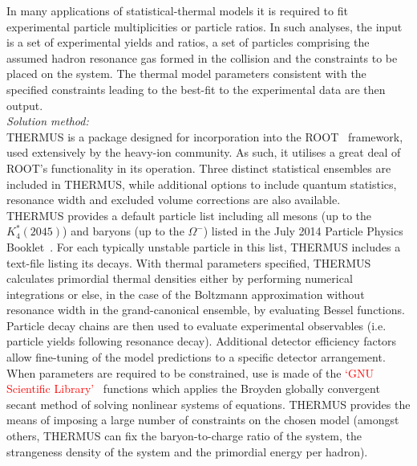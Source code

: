\documentclass{elsarticle}
\begin{document}
\begin{small}
In many applications of statistical-thermal models it is required to fit experimental 
particle multiplicities or particle ratios. In such analyses, the 
input is a set of experimental yields and ratios, a set of particles comprising 
the assumed hadron resonance gas formed in the collision and the constraints to be placed on the system. The thermal model parameters 
consistent with the specified constraints leading to the best-fit 
to the experimental data are then output.\\    

{\em Solution method:}\\

THERMUS is a package designed for incorporation into the ROOT~\cite{Brun:1997pa} framework, used extensively by the 
heavy-ion community. As such, it utilises a great deal of ROOT's functionality in its operation. Three 
distinct statistical ensembles are included in THERMUS, while additional options to include 
quantum statistics, resonance width and excluded volume corrections are also available.\\

THERMUS provides a default particle list including all mesons (up to the $K_4^*(2045)$) and 
baryons (up to the $\Omega^-$) listed in the July 2014 Particle Physics Booklet~\cite{Agashe:2014kda}.
For each typically unstable particle in 
this list, THERMUS includes a text-file listing its decays. With thermal parameters specified, 
THERMUS calculates primordial thermal densities either by 
performing numerical integrations or else, in the case of the Boltzmann approximation without resonance width in the grand-canonical ensemble, 
by evaluating Bessel functions. Particle decay chains are then used to evaluate 
experimental observables (i.e. particle yields following resonance decay). Additional detector efficiency 
factors allow fine-tuning of the model predictions to a specific detector arrangement.\\

When parameters are required to be constrained, use is made of the 
\textcolor{red}{`GNU Scientific Library'~\cite{galassi:2009gsl}} functions which applies the Broyden globally
convergent secant method of solving nonlinear systems of equations. THERMUS provides the means 
of imposing a large number of constraints on the chosen model (amongst others, THERMUS can fix the 
baryon-to-charge ratio of the system, the strangeness density of the system and the primordial energy 
per hadron).\\


\end{small}
\end{document}

